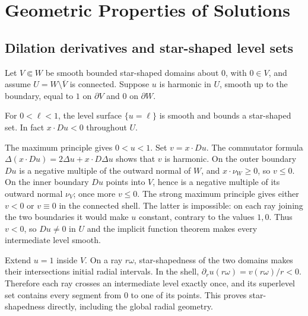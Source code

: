 \section{Geometric Properties of Solutions}
\label{sec:9-5}
\Needspace{40mm}
\subsection{Dilation derivatives and star-shaped level sets}
Let $V\Subset W$ be smooth bounded star-shaped domains about $0$, with
$0\in V$, and assume $U=W\setminus\overline V$ is connected. Suppose
$u$ is harmonic in $U$, smooth up to the boundary, equal to $1$ on
$\partial V$ and $0$ on $\partial W$.
\Needspace{50mm}
\begin{theorem}
For $0<\ell<1$, the level surface $\{u=\ell\}$ is smooth and bounds
a star-shaped set. In fact $x\cdot Du<0$ throughout $U$.
\end{theorem}
\begin{expandedproof}
The maximum principle gives $0<u<1$. Set $v=x\cdot Du$.
The commutator formula
$\Delta(x\cdot Du)=2\Delta u+x\cdot D\Delta u$ shows that $v$ is harmonic.
On the outer boundary $Du$ is a negative multiple of the outward normal
of $W$, and $x\cdot\nu_W\geq0$, so $v\leq0$.
On the inner boundary $Du$ points into $V$, hence is a negative multiple
of its outward normal $\nu_V$; once more $v\leq0$.
The strong maximum principle gives either $v<0$ or $v\equiv0$ in the
connected shell. The latter is impossible: on each ray joining the two
boundaries it would make $u$ constant, contrary to the values $1,0$.
Thus $v<0$, so $Du\ne0$ in $U$ and the implicit function theorem makes
every intermediate level smooth.

Extend $u=1$ inside $V$. On a ray $r\omega$, star-shapedness of the two
domains makes their intersections initial radial intervals. In the shell,
$\partial_r u(r\omega)=v(r\omega)/r<0$. Therefore each ray crosses an
intermediate level exactly once, and its superlevel set contains every
segment from $0$ to one of its points. This proves star-shapedness
directly, including the global radial geometry.
\end{expandedproof}
\Needspace{42mm}

